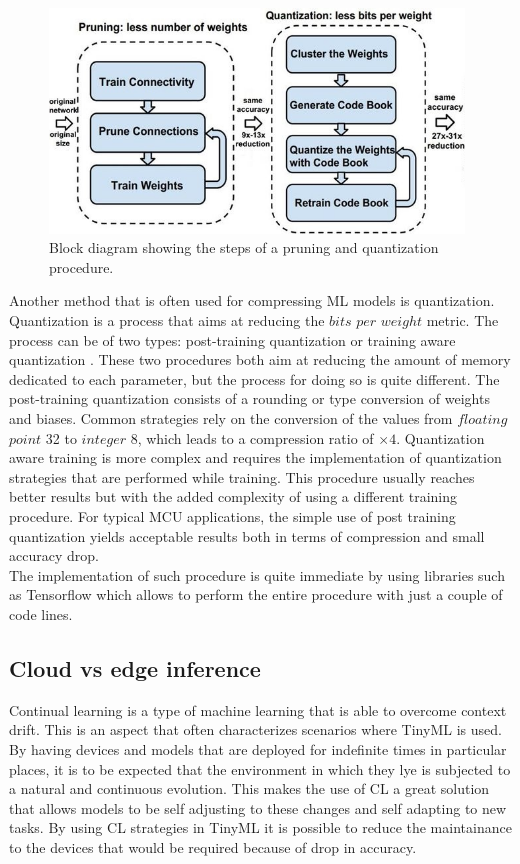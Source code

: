 \documentclass[12pt]{report}
\begin{document}
\begin{figure}[h!]
    \centering
    \includegraphics[width=110mm]{Figures/Chapter1/pruning.jpg} 
    \caption{Block diagram showing the steps of a pruning and quantization procedure.}
    \label{fig:pruning}    
\end{figure}  

Another method that is often used for compressing ML models is quantization. Quantization is a process that aims at reducing the $bits$ $per$ $weight$ metric. The process can be of two types: post-training quantization or training aware quantization \autocite{pruning_article}. These two procedures both aim at reducing the amount of memory dedicated to each parameter, but the process for doing so is quite different. The post-training quantization consists of a rounding or type conversion of weights and biases. Common strategies rely on the conversion of the values from $floating$ $point$ 32 to $integer$ 8, which leads to a compression ratio of $\times 4$. Quantization aware training is more complex and requires the implementation of quantization strategies that are performed while training. This procedure usually reaches better results but with the added complexity of using a different training procedure. For typical MCU applications, the simple use of post training quantization yields acceptable results both in terms of compression and small accuracy drop. \\
The implementation of such procedure is quite immediate by using libraries such as Tensorflow \autocite{tensorflow_quantization} which allows to perform the entire procedure with just a couple of code lines.



\subsection{Cloud vs edge inference}
Continual learning is a type of machine learning that is able to overcome context drift. This is an aspect that often characterizes scenarios where TinyML is used. By having devices and models that are deployed for indefinite times in particular places, it is to be expected that the environment in which they lye is subjected to a natural and continuous evolution. This makes the use of CL a great solution that allows models to be self adjusting to these changes and self adapting to new tasks. By using CL strategies in TinyML it is possible to reduce the maintainance to the devices that would be required because of drop in accuracy. 
\end{document}
